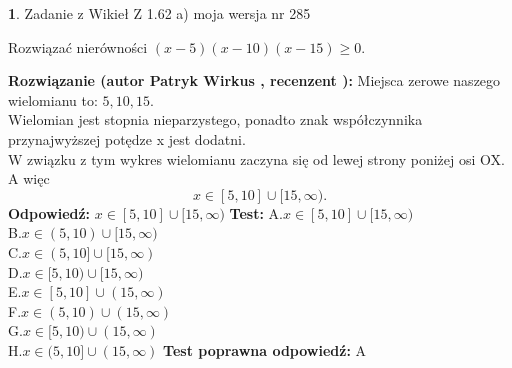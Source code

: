 \documentclass[12pt, a4paper]{article}
\theoremstyle{definition} %
\newtheorem{zad}{}
\newcommand{\zadStart}[1]{\begin{zad}#1\newline}
\newcommand{\zadStop}{\end{zad}}
\newcommand{\rozwStart}[2]{\noindent \textbf{Rozwiązanie (autor #1 , recenzent #2): }\newline}
\newcommand{\rozwStop}{\newline}
\newcommand{\odpStart}{\noindent \textbf{Odpowiedź:}\newline}
\newcommand{\odpStop}{\newline}
\newcommand{\testStart}{\noindent \textbf{Test:}\newline}
\newcommand{\testStop}{\newline}
\newcommand{\kluczStart}{\noindent \textbf{Test poprawna odpowiedź:}\newline}
\newcommand{\kluczStop}{\newline}
\begin{document}
\zadStart{Zadanie z Wikieł Z 1.62 a) moja wersja nr 285}

Rozwiązać nierówności $(x-5)(x-10)(x-15)\ge0$.
\zadStop
\rozwStart{Patryk Wirkus}{}
Miejsca zerowe naszego wielomianu to: $5, 10, 15$.\\
Wielomian jest stopnia nieparzystego, ponadto znak współczynnika przy\linebreak najwyższej potędze x jest dodatni.\\ W związku z tym wykres wielomianu zaczyna się od lewej strony poniżej osi OX. A więc $$x \in [5,10] \cup [15,\infty).$$
\rozwStop
\odpStart
$x \in [5,10] \cup [15,\infty)$
\odpStop
\testStart
A.$x \in [5,10] \cup [15,\infty)$\\
B.$x \in (5,10) \cup [15,\infty)$\\
C.$x \in (5,10] \cup [15,\infty)$\\
D.$x \in [5,10) \cup [15,\infty)$\\
E.$x \in [5,10] \cup (15,\infty)$\\
F.$x \in (5,10) \cup (15,\infty)$\\
G.$x \in [5,10) \cup (15,\infty)$\\
H.$x \in (5,10] \cup (15,\infty)$
\testStop
\kluczStart
A
\kluczStop
\end{document}
